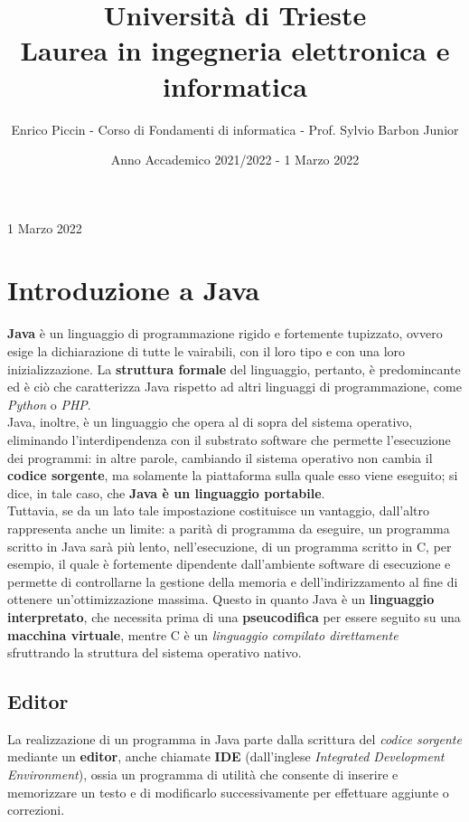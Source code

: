 \documentclass[a4paper]{extarticle}
\title{\textbf{Università di Trieste\\ \vspace{1em}
Laurea in ingegneria elettronica e informatica}}
\author{Enrico Piccin - Corso di Fondamenti di informatica - Prof. Sylvio Barbon Junior}
\date{Anno Accademico 2021/2022 - 1 Marzo 2022}
\begin{document}
\vspace{-10mm}
\maketitle

\tableofcontents
\newpage
\lstlistoflistings
\newpage

\noindent
\begin{center}
  1 Marzo 2022
\end{center}

\section{Introduzione a Java}
\textbf{Java} è un linguaggio di programmazione rigido e fortemente tupizzato, ovvero esige la dichiarazione di tutte le vairabili, con il loro tipo e con una loro inizializzazione. La \textbf{struttura formale} del linguaggio, pertanto, è predomincante ed è ciò che caratterizza Java rispetto ad altri linguaggi di programmazione, come \emph{Python} o \emph{PHP}.\\
Java, inoltre, è un linguaggio che opera al di sopra del sistema operativo, eliminando l'interdipendenza con il substrato software che permette l'esecuzione dei programmi: in altre parole, cambiando il sistema operativo non cambia il \textbf{codice sorgente}, ma solamente la piattaforma sulla quale esso viene eseguito; si dice, in tale caso, che \textbf{Java è un linguaggio portabile}.\\
Tuttavia, se da un lato tale impostazione costituisce un vantaggio, dall'altro rappresenta anche un limite: a parità di programma da eseguire, un programma scritto in Java sarà più lento, nell'esecuzione, di un programma scritto in C, per esempio, il quale è fortemente dipendente dall'ambiente software di esecuzione e permette di controllarne la gestione della memoria e dell'indirizzamento al fine di ottenere un'ottimizzazione massima. Questo in quanto Java è un \textbf{linguaggio interpretato}, che necessita prima di una \textbf{pseucodifica} per essere seguito su una \textbf{macchina virtuale}, mentre C è un \emph{linguaggio compilato direttamente} sfruttrando la struttura del sistema operativo nativo.

\vspace{1em}
\subsection{Editor}
La realizzazione di un programma in Java parte dalla scrittura del \emph{codice sorgente} mediante un \textbf{editor}, anche chiamate \textbf{IDE} (dall'inglese \emph{Integrated Development Environment}), ossia un programma di utilità che consente di inserire e memorizzare un testo e di modificarlo successivamente per effettuare aggiunte o correzioni.
\end{document}
